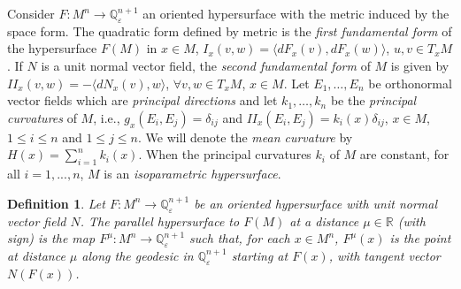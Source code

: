 \documentclass[11pt,a4paper,reqno]{amsproc}
\numberwithin{equation}{section}
\newtheorem{definition}[theorem]{\bf Definition}
\newcommand{\R}{\mathbb{R}}
\newcommand{\qe}{\mathbb {Q}^{n+1}_{\varepsilon}}
\begin{document}
Consider $F:M^{n} \longrightarrow \qe$ an oriented hypersurface with the metric induced by  the space form. 
The quadratic form defined by metric is  the {\it {first fundamental form}} of the hypersurface $F(M)$ in $x \in M$, $I_x(v,w)=\langle dF_{x}(v),dF_{x}(w) \rangle$, $u,v \in T_{x}M$ . 
If $N$ is a unit normal vector field, the {\it{second fundamental form}} of $M$ is given by 
$ II_{x}(v,w)=-\langle dN_{x}(v),w \rangle$, 
$\forall v, w \in T_{x}M$, $x \in M$. Let $E_{1},\ldots, E_{n}$ be orthonormal vector fields which are {\it{principal directions}} and let $k_{1},\ldots, k_{n}$ be the {\it{principal curvatures}} of $M$, i.e.,
$g_{x}(E_{i},E_{j})=\delta_{ij}$   and   $II_{x}(E_{i},E_{j})=k_{i}(x)\delta_{ij}$, 
$x \in M$, $1\leq i \leq n$ and $1\leq j \leq n$. We will denote the {\it{mean curvature}} by $H(x)=\sum_{i=1}^{n}k_{i}(x)$.
When the principal curvatures $k_{i}$ of $M$ are constant, for all $i=1,...,n$,  $M$ is an {\it{isoparametric hypersurface}}.

\begin{definition}\label{res.3}{\rm
Let $F: M^{n} \longrightarrow \qe$ be an oriented hypersurface with unit normal vector field $N$. The {\em parallel hypersurface} to $F(M)$ at a distance $\mu \in \R$ (with sign) is the map $ {F}^{\mu}: M^{n} \longrightarrow \qe$ such that, for each $x \in M^{n}$, 
$F^\mu (x)$ is the point at distance $\mu$ along the geodesic in $\qe$  starting 
at $F(x)$, with tangent vector $N(F(x))$.  
} 
\end{definition}
\end{document}

